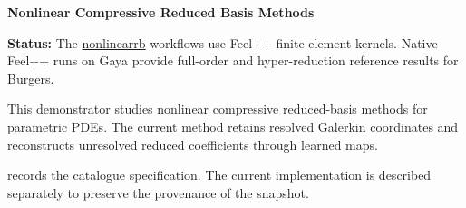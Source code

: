 
\textbf{Nonlinear Compressive Reduced Basis Methods}

\label{sec:app:specs:app-feelpp-nlcrb}

\textbf{Status:} The \href{https://github.com/feelpp/nonlinearrb}{nonlinearrb}
workflows use Feel++ finite-element kernels. Native Feel++ runs on Gaya
provide full-order and hyper-reduction reference results for Burgers.

This demonstrator studies nonlinear compressive reduced-basis methods for parametric PDEs. The current method retains resolved Galerkin coordinates and reconstructs unresolved reduced coefficients through learned maps.

 records the catalogue specification. The current implementation is described separately to preserve the provenance of the snapshot.


